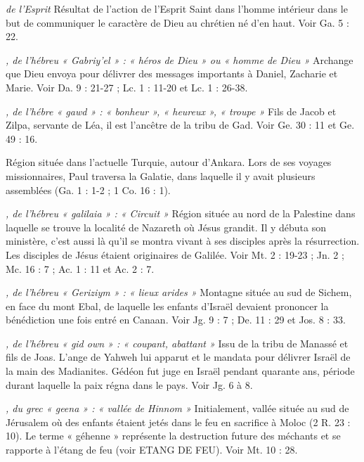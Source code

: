 \begin{multicols}{2}
\textit{de l'Esprit}\newline
Résultat de l'action de l'Esprit Saint dans l’homme intérieur dans le but de communiquer le caractère de Dieu au chrétien né d’en haut. Voir Ga. 5 : 22.

\textit{, de l'hébreu « Gabriy'el » : « héros de Dieu » ou « homme de Dieu »}\newline
Archange que Dieu envoya pour délivrer des messages importants à Daniel, Zacharie et Marie. Voir Da. 9 : 21-27 ; Lc. 1 : 11-20 et Lc. 1 : 26-38.

\textit{, de l’hébre « gawd » : « bonheur », « heureux », « troupe »}\newline
Fils de Jacob et Zilpa, servante de Léa, il est l'ancêtre de la tribu de Gad. Voir Ge. 30 : 11 et Ge. 49 : 16.

\textit{}\newline
Région située dans l'actuelle Turquie, autour d'Ankara. Lors de ses voyages missionnaires, Paul traversa la Galatie, dans laquelle il y avait plusieurs assemblées (Ga. 1 : 1-2 ; 1 Co. 16 : 1).

\textit{, de l’hébreu « galilaia » : « Circuit »}\newline
Région située au nord de la Palestine dans laquelle se trouve la localité de Nazareth où Jésus grandit. Il y débuta son ministère, c’est aussi là qu’il se montra vivant à ses disciples après la résurrection. Les disciples de Jésus étaient originaires de Galilée. Voir Mt. 2 : 19-23 ; Jn. 2 ; Mc. 16 : 7 ; Ac. 1 : 11 et Ac. 2 : 7.

\textit{, de l'hébreu « Geriziym » : « lieux arides »}\newline
Montagne située au sud de Sichem, en face du mont Ebal, de laquelle les enfants d’Israël devaient prononcer la bénédiction une fois entré en Canaan. Voir Jg. 9 : 7 ; De. 11 : 29 et Jos. 8 : 33.

\textit{, de l'hébreu « gid own » : « coupant, abattant »}\newline
Issu de la tribu de Manassé et fils de Joas. L'ange de Yahweh lui apparut et le mandata pour délivrer Israël de la main des Madianites. Gédéon fut juge en Israël pendant quarante ans, période durant laquelle la paix régna dans le pays. Voir Jg. 6 à 8.

\textit{, du grec « geena » : « vallée de Hinnom »}\newline
Initialement, vallée située au sud de Jérusalem où des enfants étaient jetés dans le feu en sacrifice à Moloc (2 R. 23 : 10). Le terme « géhenne » représente la destruction future des méchants et se rapporte à l'étang de feu (voir ETANG DE FEU). Voir Mt. 10 : 28.


\end{multicols}
